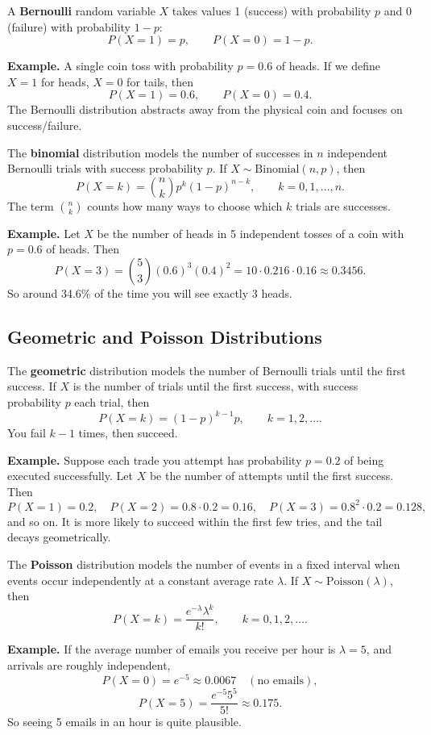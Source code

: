 \documentclass[11pt,a4paper]{article}
\begin{document}
A \textbf{Bernoulli} random variable \(X\) takes values 1 (success) with probability \(p\) and 0 (failure) with probability \(1-p\):
\[
P(X=1) = p,\qquad P(X=0) = 1-p.
\]

\textbf{Example.}  
A single coin toss with probability \(p=0.6\) of heads.  
If we define \(X=1\) for heads, \(X=0\) for tails, then
\[
P(X=1) = 0.6,\qquad P(X=0) = 0.4.
\]
The Bernoulli distribution abstracts away from the physical coin and focuses on success/failure.

The \textbf{binomial} distribution models the number of successes in \(n\) independent Bernoulli trials with success probability \(p\).  
If \(X \sim \text{Binomial}(n,p)\), then
\[
P(X=k) = \binom{n}{k} p^k (1-p)^{n-k},\qquad k=0,1,\dots,n.
\]
The term \(\binom{n}{k}\) counts how many ways to choose which \(k\) trials are successes.

\textbf{Example.}  
Let \(X\) be the number of heads in 5 independent tosses of a coin with \(p=0.6\) of heads.  
Then
\[
P(X=3) = \binom{5}{3} (0.6)^3 (0.4)^2
= 10 \cdot 0.216 \cdot 0.16
\approx 0.3456.
\]
So around 34.6\% of the time you will see exactly 3 heads.

\subsection{Geometric and Poisson Distributions}

The \textbf{geometric} distribution models the number of Bernoulli trials until the first success.  
If \(X\) is the number of trials until the first success, with success probability \(p\) each trial, then
\[
P(X = k) = (1-p)^{k-1} p,\qquad k = 1,2,\dots.
\]
You fail \(k-1\) times, then succeed.

\textbf{Example.}  
Suppose each trade you attempt has probability \(p = 0.2\) of being executed successfully.  
Let \(X\) be the number of attempts until the first success.  
Then
\[
P(X=1) = 0.2,\quad
P(X=2) = 0.8 \cdot 0.2 = 0.16,\quad
P(X=3) = 0.8^2 \cdot 0.2 = 0.128,
\]
and so on.  
It is more likely to succeed within the first few tries, and the tail decays geometrically.

The \textbf{Poisson} distribution models the number of events in a fixed interval when events occur independently at a constant average rate \(\lambda\).  
If \(X \sim \text{Poisson}(\lambda)\), then
\[
P(X = k) = \frac{e^{-\lambda} \lambda^{k}}{k!},\qquad k=0,1,2,\dots.
\]

\textbf{Example.}  
If the average number of emails you receive per hour is \(\lambda=5\), and arrivals are roughly independent,  
\[
P(X=0) = e^{-5} \approx 0.0067 \quad (\text{no emails}),
\]
\[
P(X=5) = \frac{e^{-5} 5^5}{5!} \approx 0.175.
\]
So seeing 5 emails in an hour is quite plausible.
\end{document}
